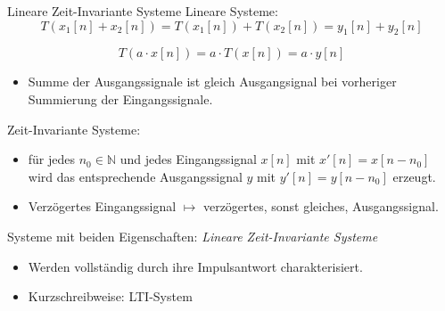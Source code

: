 \begin{frame}[allowframebreaks]{Lineare Zeit-Invariante Systeme}
    Lineare Systeme:
    \linebreak
    \begin{equation}
        T(x_1[n]+x_2[n])=T(x_1[n])+T(x_2[n])=y_1[n]+y_2[n]
    \end{equation}

    \begin{equation}
        T(a\cdot x[n])=a\cdot T(x[n])=a\cdot y[n]
    \end{equation}
    \begin{itemize}
        \item Summe der Ausgangssignale ist gleich Ausgangsignal bei vorheriger Summierung der Eingangssignale.
    \end{itemize}


    \framebreak

    Zeit-Invariante Systeme:
    \linebreak
    \begin{itemize}
        \item für jedes $n_0\in\mathbb{N}$ und jedes Eingangssignal $x[n]$ mit $x'[n]=x[n-n_0]$ wird das entsprechende Ausgangssignal $y$ mit $y'[n]=y[n-n_0]$ erzeugt.
        \item Verzögertes Eingangssignal $\mapsto$ verzögertes, sonst gleiches, Ausgangssignal.
    \end{itemize}

    \framebreak

    Systeme mit beiden Eigenschaften: \textit{Lineare Zeit-Invariante Systeme}
    \linebreak
    \begin{itemize}
        \item Werden vollständig durch ihre Impulsantwort charakterisiert.
        \item Kurzschreibweise: LTI-System
    \end{itemize}

\end{frame}